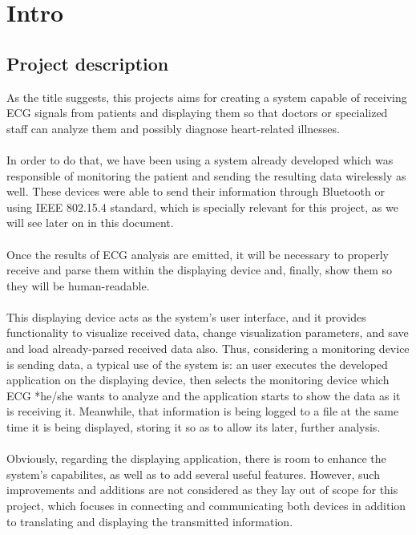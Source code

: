 \chapter{Intro}
\label{cha:intro}
	\section{Project description}
		As the title suggests, this projects aims for creating a system capable of receiving ECG signals from
		patients and displaying them so that doctors or specialized staff can analyze them and possibly diagnose
		heart-related illnesses.\\\\
		In order to do that, we have been using a system already developed which
		was responsible of monitoring the patient and sending the resulting data wirelessly as well. These
		devices were able to send their information through Bluetooth or using IEEE 802.15.4 standard, which
		is specially relevant for this project, as we will see later on in this document.\\\\
		Once the results of ECG analysis are emitted, it will be necessary to properly receive and parse them
		within the displaying device and, finally, show them so they will be human-readable.\\\\
		This displaying device acts as the system's user interface, and it provides
		functionality to visualize received data, change visualization parameters, and save and load
		already-parsed received data also. Thus, considering a monitoring device is sending data,
		a typical use of the system is: an user executes the developed application on the displaying
		device, then selects the monitoring device which ECG *he/she wants to analyze and the application %
		starts to show the data as it is receiving it. Meanwhile, that information is being logged to 
		a file at the same time it is being displayed, storing it so as to allow its later, further
		analysis.\\\\
		Obviously, regarding the displaying application, there is room to enhance the system's capabilites,
		as well as to add several useful features. However, such improvements and additions are not
		considered as they lay out of scope for this project, which focuses in connecting and communicating
		both devices in addition to translating and displaying the transmitted information.\\\\ 
